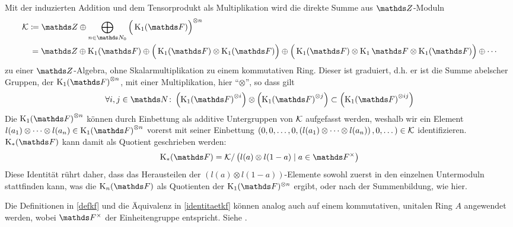 \documentclass[ngerman,fontsize=11pt, paper=a4, parskip=half, titlepage=true, toc=bib]{scrartcl}
\begin{document}
\begin{Bem}\label{identitaetkf}
  Mit der induzierten Addition und dem Tensorprodukt als
  Multiplikation wird die direkte Summe aus $\Z$-Moduln
  \begin{align*}
    \calK &\coloneqq
    \Z\oplus\bigoplus_{n\in\N_0}{\Big(\K_1(\F)\Big)}^{\otimes n}\\
    &\,= \Z\oplus\K_1(\F)
      \oplus\Big(\K_1(\F)\otimes\K_1(\F)\Big)
    \oplus\Big(\K_1(\F)\otimes\K_1\F\otimes\K_1(\F)\Big)
    \oplus\dotsb
  \end{align*}
  zu einer $\Z$-Algebra, 
  ohne Skalarmultiplikation zu einem kommutativen Ring.
  Dieser ist graduiert, d.h. er ist die Summe abelscher Gruppen, 
  der ${\K_1(\F)}^{\otimes n}$, mit einer Multiplikation, hier
  \enquote{$\otimes$}, so dass gilt
  \begin{gather*}
    \forall i,j\in \N\colon 
    \left( {\K_1(\F)}^{\otimes i} \right) \otimes
    \left( {\K_1(\F)}^{\otimes j} \right)
    \subset \left( {\K_1(\F)}^{\otimes ij} \right)
  \end{gather*}
  Die ${\KoF}^{\otimes n}$ können durch Einbettung als additive 
  Untergruppen von $\mathcal{K}$ aufgefasst
  werden, weshalb wir ein Element
  $l(a_1)\otimes\dotsb\otimes l(a_n)\in {\KoF}^{\otimes n}$
  vorerst mit seiner Einbettung
  $\left(0,0,\dotsc,0,\left(l(a_1)\otimes\dotsb\otimes
      l(a_n)\right),0,\dotsc\right)\in\mathcal{K}$
  identifizieren.
  $\KF$ kann damit als Quotient geschrieben werden:
  \begin{gather*}
    \KF = \calK / \left(l(a)\otimes l(1-a)\mid a\in\Fx\right)
  \end{gather*}
  Diese Identität rührt daher, dass das Herausteilen 
  der $(l(a)\otimes l(1-a))$-Elemente sowohl zuerst in den einzelnen
  Untermoduln stattfinden kann, was die $\KnF$ als Quotienten der
  $\KoF^{\otimes n}$ ergibt, 
  oder nach der Summenbildung, wie hier.
\end{Bem}

\begin{Bem}
  Die Definitionen in \ref{defkf} und die Äquivalenz in 
  \ref{identitaetkf} können analog auch auf 
  einem kommutativen, unitalen Ring $A$ angewendet werden,
  wobei $\Fx$ der Einheitengruppe entspricht. Siehe \cite{kerzdipl,kerz}.
\end{Bem}
\end{document}

